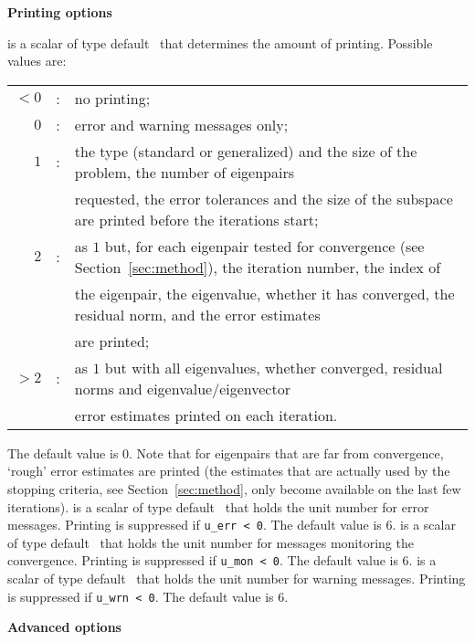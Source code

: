 \medskip
\noindent
{\bf Printing options}

\begin{description}
%
 is a scalar of type default \Integer\ that
determines the amount of printing.
Possible values are:
%
\begin{tabular}{rcl}
$<0$ &:& no printing;\\
$0$ &:& error and warning messages only;\\
$1$ &:& the type (standard or generalized) and the size of the problem,
the number of eigenpairs \\ 
& & requested, the error tolerances and
the size of the subspace are printed before the iterations start;\\
$2$ &:& as $1$ but, for each eigenpair tested for convergence
(see Section~\ref{sec:method}), the iteration number,
the index of \\
& & 
the eigenpair, the
eigenvalue, whether it has converged, the residual norm, and the error
estimates \\
& & are printed;\\
$>2$ &:& as $1$ but with all eigenvalues, whether converged, residual norms
and eigenvalue/eigenvector\\ 
& & error estimates printed on each iteration. 
\end{tabular}

\noindent
The default value is 0. %
Note that for eigenpairs that are far from convergence,
`rough' error estimates are printed
(the estimates that are actually used by the stopping criteria,
see Section~\ref{sec:method}, only become available on the last few
iterations).
%
 is a scalar of type default \Integer\ that
holds the unit number for error messages.
Printing is suppressed if {\tt u\_err < 0}.
The default value is 6. 
%
 is a scalar of type default \Integer\ that
holds the unit number for messages  monitoring the convergence.
Printing is suppressed if {\tt u\_mon < 0}.
The default value is 6. 
%
 is a scalar of type default \Integer\ that
holds the unit number for warning messages.
Printing is suppressed if {\tt u\_wrn < 0}.
The default value is 6. 
%
\end{description}

\medskip
\noindent
{\bf Advanced options}

